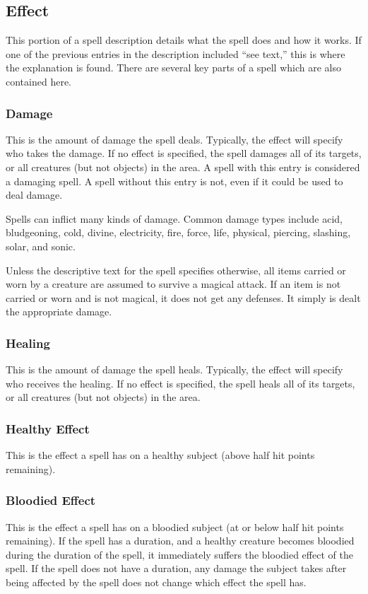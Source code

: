 \subsection{Effect}
This portion of a spell description details what the spell does and how it works. If one of the previous entries in the description included ``see text,'' this is where the explanation is found. There are several key parts of a spell which are also contained here.

\subsubsection{Damage}
This is the amount of damage the spell deals. Typically, the effect will specify who takes the damage. If no effect is specified, the spell damages all of its targets, or all creatures (but not objects) in the area. A spell with this entry is considered a damaging spell. A spell without this entry is not, even if it could be used to deal damage.

Spells can inflict many kinds of damage. Common damage types include acid, bludgeoning, cold, divine, electricity, fire, force, life, physical, piercing, slashing, solar, and sonic.

 Unless the descriptive text for the spell specifies otherwise, all items carried or worn by a creature are assumed to survive a magical attack. If an item is not carried or worn and is not magical, it does not get any defenses. It simply is dealt the appropriate damage.

\subsubsection{Healing}
This is the amount of damage the spell heals. Typically, the effect will specify who receives the healing. If no effect is specified, the spell heals all of its targets, or all creatures (but not objects) in the area.

\subsubsection{Healthy Effect}
This is the effect a spell has on a healthy subject (above half hit points remaining).

\subsubsection{Bloodied Effect}
This is the effect a spell has on a bloodied subject (at or below half hit points remaining). If the spell has a duration, and a healthy creature becomes bloodied during the duration of the spell, it immediately suffers the bloodied effect of the spell. If the spell does not have a duration, any damage the subject takes after being affected by the spell does not change which effect the spell has.

